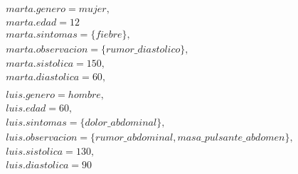 \documentclass[10pt, a4paper,spanish]{article}
\begin{document}
			\begin{equation*}
				\begin{split}
					marta.genero=mujer, \\
					marta.edad=12 \\
					marta.sintomas=\{fiebre\}, \\
					marta.observacion=\{rumor\_diastolico\}, \\
					marta.sistolica=150, \\
					marta.diastolica=60,\\
					\\
					luis.genero=hombre, \\
					luis.edad=60, \\
					luis.sintomas=\{dolor\_abdominal\}, \\
					luis.observacion=\{rumor\_abdominal, masa\_pulsante\_abdomen\}, \\
					luis.sistolica=130, \\
					luis.diastolica=90\\
				\end{split}
			\end{equation*}
\end{document}
